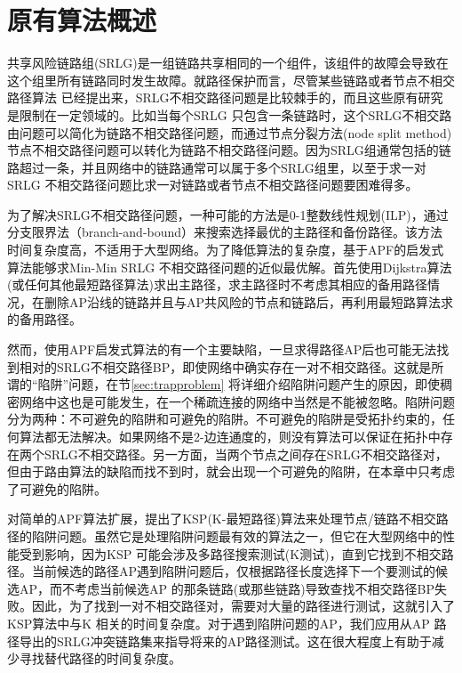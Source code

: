 \section{原有算法概述}
共享风险链路组(SRLG)是一组链路共享相同的一个组件，该组件的故障会导致在这个组里所有链路同时发生故障。就路径保护而言，尽管某些链路或者节点不相交路径算法\cite{suurballe1984quick,bhandari1997optimal,li1990complexity,guo2003link,xu2004finding,beshir2011variants,guo2013finding,hu2003diverse} 已经提出来，SRLG不相交路径问题是比较棘手的，而且这些原有研究是限制在一定领域的。比如当每个SRLG 只包含一条链路时，这个SRLG不相交路由问题可以简化为链路不相交路径问题，而通过节点分裂方法(node split method)\cite{ford2015flows}节点不相交路径问题可以转化为链路不相交路径问题。因为SRLG组通常包括的链路超过一条，并且网络中的链路通常可以属于多个SRLG组里，以至于求一对SRLG 不相交路径问题比求一对链路或者节点不相交路径问题要困难得多。

为了解决SRLG不相交路径问题，一种可能的方法是0-1整数线性规划(ILP)\cite{hu2003diverse}，通过分支限界法（branch-and-bound）来搜索选择最优的主路径和备份路径。该方法时间复杂度高，不适用于大型网络。为了降低算法的复杂度，基于APF的启发式算法\cite{oki2002disjoint,li2002fiber,eppstein1998finding}能够求Min-Min SRLG 不相交路径问题的近似最优解。首先使用Dijkstra算法(或任何其他最短路径算法)求出主路径，求主路径时不考虑其相应的备用路径情况，在删除AP沿线的链路并且与AP共风险的节点和链路后，再利用最短路算法求的备用路径。

然而，使用APF启发式算法的有一个主要缺陷，一旦求得路径AP后也可能无法找到相对的SRLG不相交路径BP，即使网络中确实存在一对不相交路径。这就是所谓的“陷阱”问题，在节\ref{sec:trapproblem} 将详细介绍陷阱问题产生的原因，即使稠密网络中\cite{laborczi2001solving}这也是可能发生，在一个稀疏连接的网络中当然是不能被忽略。陷阱问题分为两种：不可避免的陷阱和可避免的陷阱。不可避免的陷阱是受拓扑约束的，任何算法都无法解决。如果网络不是2-边连通度的，则没有算法可以保证在拓扑中存在两个SRLG不相交路径。另一方面，当两个节点之间存在SRLG不相交路径对，但由于路由算法的缺陷而找不到时，就会出现一个可避免的陷阱，在本章中只考虑了可避免的陷阱。

对简单的APF算法扩展，提出了KSP(K-最短路径)算法来处理节点/链路不相交路径的陷阱问题。虽然它是处理陷阱问题最有效的算法之一，但它在大型网络中的性能受到影响，因为KSP 可能会涉及多路径搜索测试(K测试)，直到它找到不相交路径。当前候选的路径AP遇到陷阱问题后，仅根据路径长度选择下一个要测试的候选AP，而不考虑当前候选AP 的那条链路(或那些链路)导致查找不相交路径BP失败。因此，为了找到一对不相交路径对，需要对大量的路径进行测试，这就引入了KSP算法中与K 相关的时间复杂度。对于遇到陷阱问题的AP，我们应用从AP 路径导出的SRLG冲突链路集来指导将来的AP路径测试。这在很大程度上有助于减少寻找替代路径的时间复杂度。

